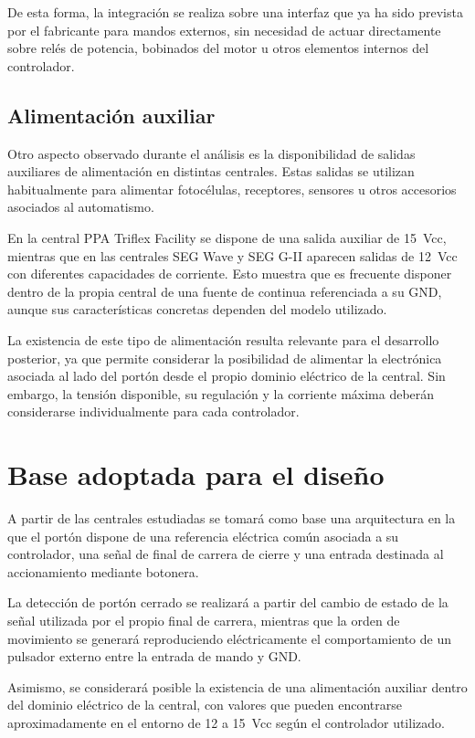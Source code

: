 De esta forma, la integración se realiza sobre una interfaz que ya ha sido prevista por el fabricante para mandos externos, sin necesidad de actuar directamente sobre relés de potencia, bobinados del motor u otros elementos internos del controlador.

\subsection{Alimentación auxiliar}

Otro aspecto observado durante el análisis es la disponibilidad de salidas auxiliares de alimentación en distintas centrales. Estas salidas se utilizan habitualmente para alimentar fotocélulas, receptores, sensores u otros accesorios asociados al automatismo.

En la central PPA Triflex Facility se dispone de una salida auxiliar de 15~Vcc, mientras que en las centrales SEG Wave y SEG G-II aparecen salidas de 12~Vcc con diferentes capacidades de corriente. Esto muestra que es frecuente disponer dentro de la propia central de una fuente de continua referenciada a su GND, aunque sus características concretas dependen del modelo utilizado.

La existencia de este tipo de alimentación resulta relevante para el desarrollo posterior, ya que permite considerar la posibilidad de alimentar la electrónica asociada al lado del portón desde el propio dominio eléctrico de la central. Sin embargo, la tensión disponible, su regulación y la corriente máxima deberán considerarse individualmente para cada controlador.

\section{Base adoptada para el diseño}

A partir de las centrales estudiadas se tomará como base una arquitectura en la que el portón dispone de una referencia eléctrica común asociada a su controlador, una señal de final de carrera de cierre y una entrada destinada al accionamiento mediante botonera.

La detección de portón cerrado se realizará a partir del cambio de estado de la señal utilizada por el propio final de carrera, mientras que la orden de movimiento se generará reproduciendo eléctricamente el comportamiento de un pulsador externo entre la entrada de mando y GND.

Asimismo, se considerará posible la existencia de una alimentación auxiliar dentro del dominio eléctrico de la central, con valores que pueden encontrarse aproximadamente en el entorno de 12 a 15~Vcc según el controlador utilizado.

